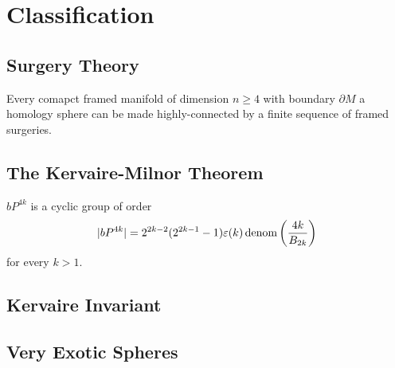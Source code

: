 \chapter{Classification}\label{chap:classification}

\section{Surgery Theory}

\begin{theorem}
  Every comapct framed manifold of dimension $n\geq 4$ with boundary $\partial M$ a homology sphere can be made highly-connected by a finite sequence of framed surgeries.
\end{theorem}

\section{The Kervaire-Milnor Theorem}

\begin{theorem}
	$bP^{4k}$ is a cyclic group of order
	\[
	  |bP^{4k}| =2^{2k-2}(2^{2k-1}-1)\varepsilon(k)\operatorname{denom}\left(\frac{4k}{B_{2k}}\right)
	\]
	for every $k>1$.
\end{theorem}

\section{Kervaire Invariant}

\section{Very Exotic Spheres}
